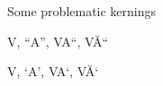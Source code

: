 \documentclass[ngerman,12pt]{article}
\begin{document}
\Large
Some problematic kernings

\guillemotright V\guillemotleft,
\textquotedblleft A\textquotedblright,
\quotedblbase VA\textquotedblleft,
\quotedblbase V\u A\textquotedblleft

\guilsinglright V\guilsinglleft,
\textquoteleft A\textquoteright,
\quotesinglbase VA\textquoteleft,
\quotesinglbase V\u A\textquoteleft
\end{document}
